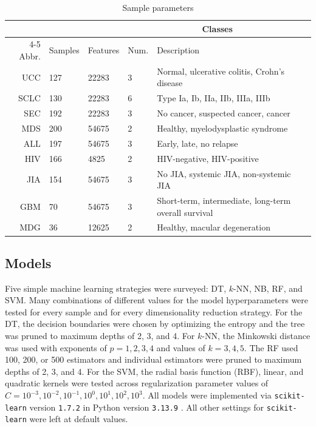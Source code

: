 \documentclass{article}
\begin{document}
\begin{table}
	\caption{Sample parameters}
	\label{samples-table}
	\centering
	\begin{tabular}{rllll}
		\toprule
		&&& \multicolumn{2}{c}{Classes} \\
		\cmidrule(r){4-5}
		Abbr. & Samples & Features & Num. & Description \\
		\midrule
		UCC & 127 & 22283 & 3 & Normal, ulcerative colitis, Crohn's disease \\
		SCLC & 130 & 22283 & 6 & Type Ia, Ib, IIa, IIb, IIIa, IIIb \\
		SEC & 192 & 22283 & 3 & No cancer, suspected cancer, cancer \\
		MDS & 200 & 54675 & 2 & Healthy, myelodysplastic syndrome \\
		ALL & 197 & 54675 & 3 & Early, late, no relapse \\
		HIV & 166 & 4825 & 2 & HIV-negative, HIV-positive\\
		JIA & 154 & 54675 & 3 & No JIA, systemic JIA, non-systemic JIA \\
		GBM & 70 & 54675 & 3 & Short-term, intermediate, long-term overall survival \\
		MDG & 36 & 12625 & 2 & Healthy, macular degeneration \\
		\bottomrule
	\end{tabular}
\end{table}

\subsection{Models}

Five simple machine learning strategies were surveyed: DT, $k$-NN, NB, RF, and SVM. Many combinations of different values for the model hyperparameters were tested for every sample and for every dimensionality reduction strategy. For the DT, the decision boundaries were chosen by optimizing the entropy and the tree was pruned to maximum depths of 2, 3, and 4. For $k$-NN, the Minkowski distance was used with exponents of $p=1,2,3,4$ and values of $k=3,4,5$. The RF used 100, 200, or 500 estimators and individual estimators were pruned to maximum depths of 2, 3, and 4. For the SVM, the radial basis function (RBF), linear, and quadratic kernels were tested across regularization parameter values of $C=10^{-3},10^{-2},10^{-1},10^0,10^1,10^2,10^3$. All models were implemented via \texttt{scikit-learn} version \texttt{1.7.2} in Python version \texttt{3.13.9} \cite{ScikitLearn, Python}. All other settings for \texttt{scikit-learn} were left at default values.
\end{document}
